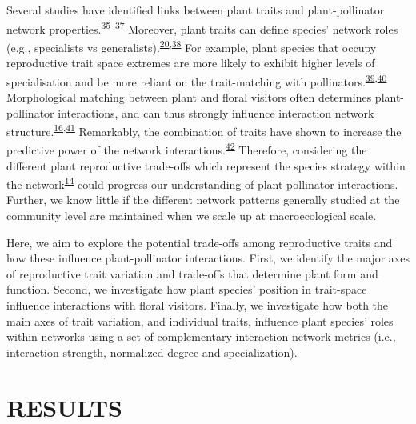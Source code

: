 \documentclass[
  12pt,
  a4paper,
]{article}
\begin{document}
Several studies have identified links between plant traits and plant-pollinator network properties.\textsuperscript{\protect\hyperlink{ref-bartomeus2013}{35}--\protect\hyperlink{ref-rowe2020}{37}} Moreover, plant traits can define species' network roles (e.g., specialists vs generalists).\textsuperscript{\protect\hyperlink{ref-tur2013}{20},\protect\hyperlink{ref-lazaro2013}{38}} For example, plant species that occupy reproductive trait space extremes are more likely to exhibit higher levels of specialisation and be more reliant on the trait-matching with pollinators.\textsuperscript{\protect\hyperlink{ref-junker2013}{39},\protect\hyperlink{ref-coux2016}{40}} Morphological matching between plant and floral visitors often determines plant-pollinator interactions, and can thus strongly influence interaction network structure.\textsuperscript{\protect\hyperlink{ref-stang2009}{16},\protect\hyperlink{ref-ibanez2012}{41}} Remarkably, the combination of traits have shown to increase the predictive power of the network interactions.\textsuperscript{\protect\hyperlink{ref-eklof2013}{42}} Therefore, considering the different plant reproductive trade-offs which represent the species strategy within the network\textsuperscript{\protect\hyperlink{ref-dehling2016}{14}} could progress our understanding of plant-pollinator interactions. Further, we know little if the different network patterns generally studied at the community level are maintained when we scale up at macroecological scale.

Here, we aim to explore the potential trade-offs among reproductive traits and how these influence plant-pollinator interactions. First, we identify the major axes of reproductive trait variation and trade-offs that determine plant form and function. Second, we investigate how plant species' position in trait-space influence interactions with floral visitors. Finally, we investigate how both the main axes of trait variation, and individual traits, influence plant species' roles within networks using a set of complementary interaction network metrics (i.e., interaction strength, normalized degree and specialization).

\hypertarget{results}{%
\section{RESULTS}\label{results}}
\end{document}
